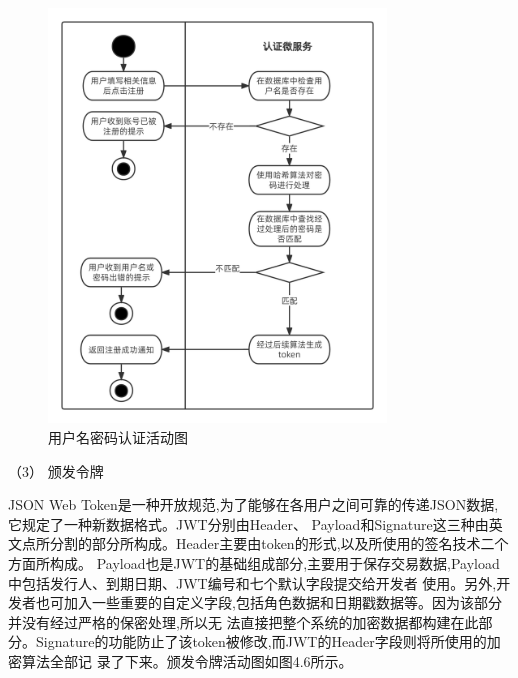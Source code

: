 \begin{figure}[htb]
    \centering
    \includegraphics[width=0.8\textwidth]{my_figures/chapter4/用户名密码认证活动图.png}
    \caption{用户名密码认证活动图}
    \label{fig:用户名密码认证活动图}
\end{figure}

（3） 颁发令牌

JSON Web Token是一种开放规范,为了能够在各用户之间可靠的传递JSON数据,它规定了一种新数据格式。JWT分别由Header、
Payload和Signature这三种由英文点所分割的部分所构成。Header主要由token的形式,以及所使用的签名技术二个方面所构成。
Payload也是JWT的基础组成部分,主要用于保存交易数据,Payload中包括发行人、到期日期、JWT编号和七个默认字段提交给开发者
使用。另外,开发者也可加入一些重要的自定义字段,包括角色数据和日期戳数据等。因为该部分并没有经过严格的保密处理,所以无
法直接把整个系统的加密数据都构建在此部分。Signature的功能防止了该token被修改,而JWT的Header字段则将所使用的加密算法全部记
录了下来。颁发令牌活动图如图4.6所示。


